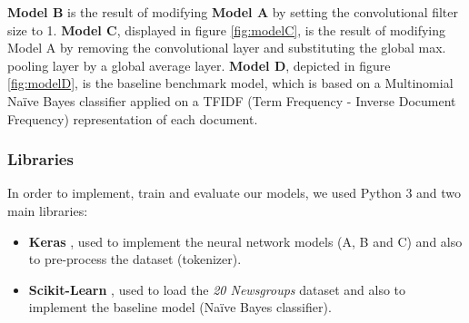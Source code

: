 \documentclass[10pt,journal,compsoc, onecolumn]{IEEEtran}
\begin{document}
\begin{table}[h]
\caption{Starting hyperparameters for Model A}
\label{tab:hparams}
\begin{center}
\end{center}
\end{table}


\textbf{Model B} is the result of modifying \textbf{Model A} by setting the convolutional filter size to 1. \textbf{Model C}, displayed in figure \ref{fig:modelC}, is the result of modifying Model A by removing the convolutional layer and substituting the global max. pooling layer by a global average layer. \textbf{Model D}, depicted in figure \ref{fig:modelD}, is the baseline benchmark model, which is based on a Multinomial Naïve Bayes classifier applied on a TFIDF (Term Frequency - Inverse Document Frequency) representation of each document. 

\subsubsection{Libraries}

In order to implement, train and evaluate our models, we used Python 3 and two main libraries:

\begin{itemize}
    \item \textbf{Keras} \cite{Keras}, used to implement the neural network models (A, B and C) and also to pre-process the dataset (tokenizer).
    \item \textbf{Scikit-Learn} \cite{Sklearn}, used to load the \textit{20 Newsgroups} dataset and also to implement the baseline model (Naïve Bayes classifier).
\end{itemize}
\end{document}
